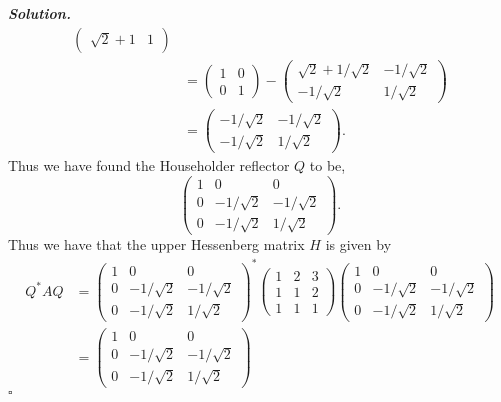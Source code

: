 \documentclass[12pt]{report}
\newenvironment{solution}[1][\it{Solution}]{\textbf{#1. } }{$\square$}
\begin{document}
\begin{solution}
\begin{align*}
\begin{pmatrix}
            \sqrt{2} + 1 & 1
        \end{pmatrix}\\
        &= \begin{pmatrix}
            1&0\\0&1
        \end{pmatrix} - \begin{pmatrix}
            \sqrt{2} + 1/\sqrt{2} & -1/\sqrt{2}\\
            -1/\sqrt{2} & 1/\sqrt{2} 
        \end{pmatrix}\\
        &=\begin{pmatrix}
            -1/\sqrt{2} & -1/\sqrt{2}\\
            -1/\sqrt{2} & 1/\sqrt{2}
        \end{pmatrix}.
    \end{align*}
    Thus we have found the Householder reflector $Q$ to be,
    \[ 
        \begin{pmatrix}
            1 & 0 & 0\\
            0 & -1/\sqrt{2} & -1/\sqrt{2}\\
            0 & -1/\sqrt{2} & 1/\sqrt{2}
        \end{pmatrix}.
    \]
    Thus we have that the upper Hessenberg matrix $H$ is given by
    \begin{align*}
        Q^*AQ &= \begin{pmatrix}
            1 & 0 & 0\\
            0 & -1/\sqrt{2} & -1/\sqrt{2}\\
            0 & -1/\sqrt{2} & 1/\sqrt{2}
        \end{pmatrix}^*\begin{pmatrix}
            1&2&3\\
            1&1&2\\
            1&1&1
        \end{pmatrix}\begin{pmatrix}
            1 & 0 & 0\\
            0 & -1/\sqrt{2} & -1/\sqrt{2}\\
            0 & -1/\sqrt{2} & 1/\sqrt{2}
        \end{pmatrix}\\
        &= \begin{pmatrix}
            1 & 0 & 0\\
            0 & -1/\sqrt{2} & -1/\sqrt{2}\\
            0 & -1/\sqrt{2} & 1/\sqrt{2}

\end{pmatrix}
\end{align*}
\end{solution}
\end{document}
